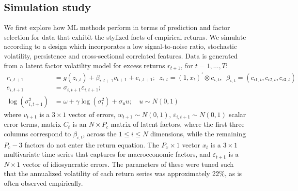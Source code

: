 \documentclass{article}
\begin{document}
\subsection{Simulation study}
We first explore how ML methods perform in terms of prediction and factor selection for data that exhibit the stylized facts of empirical returns. We simulate according to a design which incorporates a low signal-to-noise ratio, stochastic volatility, persistence and cross-sectional correlated features. Data is generated from a latent factor volatility model for excess returns $r_{t+1}$, for $t=1, \dots, T$:
\begin{align*}
r_{i, t+1} &= 
g\left(z_{i, t}\right) + \beta_{i,t+1}v_{t+1} + e_{i, t+1}; 
\enspace z_{i, t} = \left(1, x_{t}\right)^{\prime} \otimes c_{i, t}, 
\enspace \beta_{i, t} = \left(c_{i 1, t}, c_{i 2, t}, c_{i 3, t}\right) \\ 
e_{i, t+1} &= 
\sigma_{i, t+1} \varepsilon_{i, t+1}; \\
\operatorname{log} (\sigma^2_{i,t+1}) &= 
\omega + \gamma \operatorname{log} (\sigma^2_{t}) + \sigma_{u}u;
\quad u \sim N(0, 1)
\end{align*}
where $v_{t+1}$ is a $3\times 1$ vector of errors, $w_{t+1} \sim N(0, 1)$,  $\varepsilon_{i,t+1} \sim N(0, 1)$ scalar error terms, matrix $C_t$ is an $N\times P_c$ matrix of latent factors, where the first three columns correspond to $\beta_{i,t}$, across the $1\leq i\leq N$ dimensions, while the remaining $P_c-3$ factors do not enter the return equation. The $P_x\times1$ vector $x_t$ is a $3 \times 1$ multivariate time series that captures for macroeconomic factors, and $\varepsilon_{t+1}$ is a $N\times 1$ vector of idiosyncratic errors. The parameters of these were tuned such that the annualized volatility of each return series was approximately 22\%, as is often observed empirically.
\end{document}
